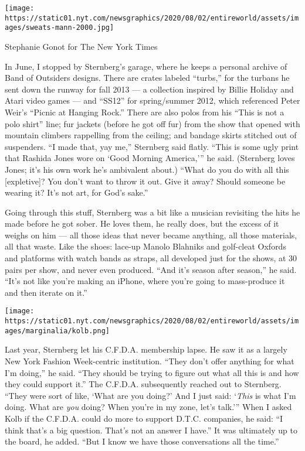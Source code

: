 \texttt{[image: https://static01.nyt.com/newsgraphics/2020/08/02/entireworld/assets/images/sweats-mann-2000.jpg]}

Stephanie Gonot for The New York Times

In June, I stopped by Sternberg's garage, where he keeps a personal
archive of Band of Outsiders designs. There are crates labeled
``turbs,'' for the turbans he sent down the runway for fall 2013 --- a
collection inspired by Billie Holiday and Atari video games --- and
``SS12'' for spring/summer 2012, which referenced Peter Weir's ``Picnic
at Hanging Rock.'' There are also polos from his ``This is not a polo
shirt'' line; fur jackets (before he got off fur) from the show that
opened with mountain climbers rappelling from the ceiling; and bandage
skirts stitched out of suspenders. ``I made that, yay me,'' Sternberg
said flatly. ``This is some ugly print that Rashida Jones wore on `Good
Morning America,''' he said. (Sternberg loves Jones; it's his own work
he's ambivalent about.) ``What do you do with all this {[}expletive{]}?
You don't want to throw it out. Give it away? Should someone be wearing
it? It's not art, for God's sake.''

Going through this stuff, Sternberg was a bit like a musician revisiting
the hits he made before he got sober. He loves them, he really does, but
the excess of it weighs on him --- all those ideas that never became
anything, all those materials, all that waste. Like the shoes: lace-up
Manolo Blahniks and golf-cleat Oxfords and platforms with watch bands as
straps, all developed just for the shows, at 30 pairs per show, and
never even produced. ``And it's season after season,'' he said. ``It's
not like you're making an iPhone, where you're going to mass-produce it
and then iterate on it.''

\texttt{[image: https://static01.nyt.com/newsgraphics/2020/08/02/entireworld/assets/images/marginalia/kolb.png]}

Last year, Sternberg let his C.F.D.A. membership lapse. He saw it as a
largely New York Fashion Week-centric institution. ``They don't offer
anything for what I'm doing,'' he said. ``They should be trying to
figure out what all this is and how they could support it.'' The
C.F.D.A. subsequently reached out to Sternberg. ``They were sort of
like, `What are you doing?' And I just said: `\emph{This} is what I'm
doing. What are \emph{you} doing? When you're in my zone, let's talk.'''
When I asked Kolb if the C.F.D.A. could do more to support D.T.C.
companies, he said: ``I think that's a big question. That's not an
answer I have.'' It was ultimately up to the board, he added. ``But I
know we have those conversations all the time.''

